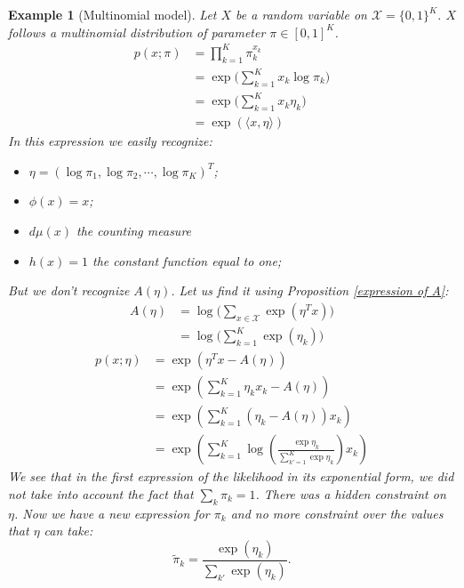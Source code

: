 \documentclass[12pt]{report}
\newtheorem{example}{Example}[section]
\begin{document}
\begin{example}[Multinomial model]
Let $X$ be a random variable on $\mathcal{X}=\{0 ,1\}^K$. $X$ follows a multinomial distribution of parameter $\pi \in [0,1]^K$.
$$\begin{aligned}
p(x;\pi) &= \prod_{k=1}^{K}{\pi_{k}^{x_k}}\\
&=\exp \Big (\sum_{k=1}^{K}{x_k \log \pi_k}\Big )\\
&=\exp \Big (\sum_{k=1}^{K}{x_k \eta_k}\Big )\\
&=\exp(\langle x, \eta \rangle )
\end{aligned}$$
In this expression we easily recognize:
\begin{itemize}
\item $\eta = (\log \pi_1,\log \pi_2, \cdots,\log \pi_K)^T$;
\item $ \phi (x)=x$;
\item $ d\mu (x)$ the counting measure
\item $ h(x) = 1$ the constant function equal to one;
\end{itemize}
But we don't recognize $A(\eta)$. Let us find it using Proposition \ref{expression of A}:
$$\begin{aligned}
A(\eta)&=\log \Big (\sum_{x\in\mathcal{X}}{\exp(\eta^T x)} \Big )\\
&=\log \Big (\sum_{k=1}^{K}{\exp(\eta_k)}\Big )
\end{aligned}$$
$$\begin{aligned}
 p(x;\eta)&=\exp(\eta^T x - A(\eta))\\
&=\exp\left(\sum_{k=1}^{K}{\eta_k x_k} - A(\eta)\right)\\
&=\exp\left(\sum_{k=1}^{K}({\eta_k - A(\eta)})x_k\right)\\
&=\exp \left( \sum_{k=1}^{K} {\log \left(  \frac{\exp \eta _k}{\sum_{k'=1}^{K}{\exp \eta _k}}\right) x_k} \right)
\end{aligned}$$
We see that in the first expression of the likelihood in its exponential form, we did not take into account the fact that $\sum_k {\pi_k}=1$. There was a hidden constraint on $\eta$. Now we have a new expression for $\pi_k$ and no more constraint over the values that $ \eta$ can take:
$$\tilde{\pi}_k = \frac{\exp (\eta _k)}{\sum_{k'}{\exp(\eta_k)}}.$$
\end{example}
\end{document}
